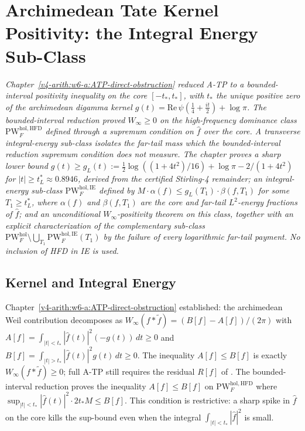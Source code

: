 \chapter{Archimedean Tate Kernel Positivity: the Integral Energy Sub-Class}
\label{v4-arith:w7-e:chapter}

\emph{Chapter~\ref{v4-arith:w6-a:ATP-direct-obstruction} reduced A-TP to a
bounded-interval positivity inequality on the core
\([-t_{\ast},t_{\ast}]\), with \(t_{\ast}\) the unique positive zero of
the archimedean digamma kernel
\(g(t)=\mathrm{Re}\,\psi(\tfrac{1}{4}+\tfrac{it}{2})+\log\pi\). The bounded-interval reduction
proved \(W_{\infty}\ge0\) on the high-frequency dominance class
\(\mathrm{PW}^{\mathrm{hol},\mathrm{HFD}}_{F}\) defined through a
supremum condition on \(\widehat{f}\) over the core. A transverse
integral-energy sub-class isolates the
far-tail mass which the bounded-interval reduction supremum condition does not measure.
The chapter proves a sharp lower bound
\(g(t)\geq g_{L}(t):=\tfrac{1}{2}\log((1+4t^{2})/16)+\log\pi-2/(1+4t^{2})\)
for \(|t|\geq t_{L}^{\ast}\approx 0.8946\), derived from the certified
Stirling-4 remainder; an integral-energy sub-class
\(\mathrm{PW}^{\mathrm{hol},\mathrm{IE}}_{F}\)
defined by \(M\cdot\alpha(f)\leq g_{L}(T_{1})\cdot\beta(f,T_{1})\)
for some \(T_{1}\geq t_{L}^{\ast}\), where \(\alpha(f)\) and \(\beta(f,T_{1})\)
are the core and far-tail \(L^{2}\)-energy fractions of \(\widehat{f}\);
and an unconditional \(W_{\infty}\)-positivity theorem on this class,
together with an
explicit characterization of the
complementary sub-class
\(\mathrm{PW}^{\mathrm{hol}}_{F}\setminus\bigcup_{T_{1}}\mathrm{PW}^{\mathrm{hol},\mathrm{IE}}_{F}(T_{1})\)
by the failure of every logarithmic far-tail payment. No inclusion of
HFD in IE is used.}

\section{Kernel and Integral Energy}
\label{v4-arith:w7-e:context}

Chapter~\ref{v4-arith:w6-a:ATP-direct-obstruction} established: the
archimedean Weil contribution decomposes as
\(W_{\infty}(f*\widetilde{f})=(B[f]-A[f])/(2\pi)\) with
\(A[f]=\int_{|t|<t_{\ast}}|\widehat{f}(t)|^{2}(-g(t))\,dt\geq 0\) and
\(B[f]=\int_{|t|>t_{\ast}}|\widehat{f}(t)|^{2}g(t)\,dt\geq 0\). The
inequality \(A[f]\leq B[f]\) is exactly
\(W_{\infty}(f*\widetilde f)\ge0\); full A-TP still requires the
residual \(R[f]\) of . The bounded-interval reduction
proves the
inequality \(A[f]\leq B[f]\) on
\(\mathrm{PW}^{\mathrm{hol},\mathrm{HFD}}_{F}\) where
\(\sup_{|t|<t_{\ast}}|\widehat{f}(t)|^{2}\cdot 2t_{\ast}M\leq B[f]\).
This condition is restrictive: a sharp spike in \(\widehat{f}\) on the
core kills the sup-bound even when the integral
\(\int_{|t|<t_{\ast}}|\widehat{f}|^{2}\) is small.

